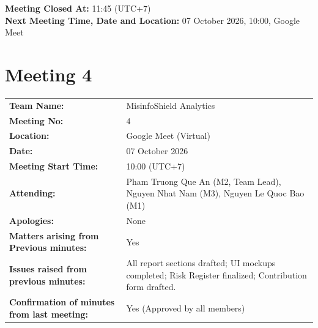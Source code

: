 \documentclass[11pt, a4paper]{article}
\begin{document}
\vspace{0.3cm}
\noindent \textbf{Meeting Closed At:} 11:45 (UTC+7)\\
\textbf{Next Meeting Time, Date and Location:} 07 October 2026, 10:00, Google Meet

\newpage

\section*{Meeting 4}
\label{sec:meeting4}

\begin{table}[H]
  \centering
  \small
  \begin{tabularx}{\linewidth}{@{}L{3.5cm} Y@{}}
    \toprule
    \textbf{Team Name:} & MisinfoShield Analytics \\
    \textbf{Meeting No:} & 4 \\
    \textbf{Location:} & Google Meet (Virtual) \\
    \textbf{Date:} & 07 October 2026 \\
    \textbf{Meeting Start Time:} & 10:00 (UTC+7) \\
    \textbf{Attending:} & Pham Truong Que An (M2, Team Lead), Nguyen Nhat Nam (M3), Nguyen Le Quoc Bao (M1) \\
    \textbf{Apologies:} & None \\
    \textbf{Matters arising from Previous minutes:} & Yes \\
    \textbf{Issues raised from previous minutes:} & All report sections drafted; UI mockups completed; Risk Register finalized; Contribution form drafted. \\
    \textbf{Confirmation of minutes from last meeting:} & Yes (Approved by all members) \\
    \bottomrule
  \end{tabularx}
\end{table}
\end{document}
